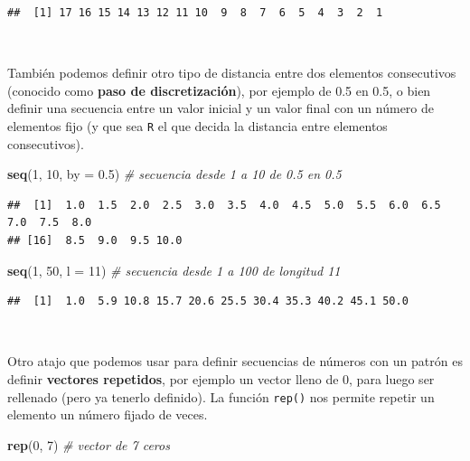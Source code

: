 \documentclass[11pt,]{book}
\newenvironment{Shaded}{\begin{snugshade}}{\end{snugshade}}
\newcommand{\CommentTok}[1]{\textcolor[rgb]{0.37,0.37,0.37}{\textit{#1}}}
\newcommand{\DataTypeTok}[1]{\textcolor[rgb]{0.27,0.27,0.27}{#1}}
\newcommand{\DecValTok}[1]{\textcolor[rgb]{0.06,0.06,0.06}{#1}}
\newcommand{\FloatTok}[1]{\textcolor[rgb]{0.06,0.06,0.06}{#1}}
\newcommand{\KeywordTok}[1]{\textcolor[rgb]{0.27,0.27,0.27}{\textbf{#1}}}
\newcommand{\NormalTok}[1]{#1}
\begin{document}
\begin{verbatim}
##  [1] 17 16 15 14 13 12 11 10  9  8  7  6  5  4  3  2  1
\end{verbatim}

~

También podemos definir otro tipo de distancia entre dos elementos consecutivos (conocido como \textbf{paso de discretización}), por ejemplo de 0.5 en 0.5, o bien definir una secuencia entre un valor inicial y un valor final con un número de elementos fijo (y que sea \texttt{R} el que decida la distancia entre elementos consecutivos).

\begin{Shaded}
\begin{Highlighting}[]
\KeywordTok{seq}\NormalTok{(}\DecValTok{1}\NormalTok{, }\DecValTok{10}\NormalTok{, }\DataTypeTok{by =} \FloatTok{0.5}\NormalTok{) }\CommentTok{# secuencia desde 1 a 10 de 0.5 en 0.5}
\end{Highlighting}
\end{Shaded}

\begin{verbatim}
##  [1]  1.0  1.5  2.0  2.5  3.0  3.5  4.0  4.5  5.0  5.5  6.0  6.5  7.0  7.5  8.0
## [16]  8.5  9.0  9.5 10.0
\end{verbatim}

\begin{Shaded}
\begin{Highlighting}[]
\KeywordTok{seq}\NormalTok{(}\DecValTok{1}\NormalTok{, }\DecValTok{50}\NormalTok{, }\DataTypeTok{l =} \DecValTok{11}\NormalTok{) }\CommentTok{# secuencia desde 1 a 100 de longitud 11}
\end{Highlighting}
\end{Shaded}

\begin{verbatim}
##  [1]  1.0  5.9 10.8 15.7 20.6 25.5 30.4 35.3 40.2 45.1 50.0
\end{verbatim}

~

Otro atajo que podemos usar para definir secuencias de números con un patrón es definir \textbf{vectores repetidos}, por ejemplo un vector lleno de 0, para luego ser rellenado (pero ya tenerlo definido). La función \texttt{rep()} nos permite repetir un elemento un número fijado de veces.

\begin{Shaded}
\begin{Highlighting}[]
\KeywordTok{rep}\NormalTok{(}\DecValTok{0}\NormalTok{, }\DecValTok{7}\NormalTok{) }\CommentTok{# vector de 7 ceros}
\end{Highlighting}
\end{Shaded}
\end{document}
